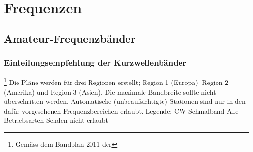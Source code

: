 
\chapter{Frequenzen}
\section{Amateur-Frequenzbänder}
\subsection{Einteilungsempfehlung der Kurzwellenbänder}\footnote{Gemäss dem Bandplan 2011 der }
Die Pläne werden für drei Regionen erstellt; Region 1 (Europa), Region 2 (Amerika) und Region 3 (Asien). Die maximale Bandbreite sollte nicht überschritten werden.
Automatische (unbeaufsichtigte) Stationen sind nur in den dafür vorgesehenen Frequenzbereichen erlaubt. Legende: CW  Schmalband  Alle Betriebsarten Senden nicht erlaubt

